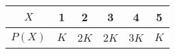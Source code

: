 \begin{tabular}[12pt]{ |c| c| c|c|c|c|}
    \hline
    $X$ & 1 & 2 & 3 & 4 & 5 \\
    \hline
    $P(X)$ & $K$ & 2$K$ & 2$K$ & 3$K$ & $K$ \\
    \hline 
    \end{tabular} 

